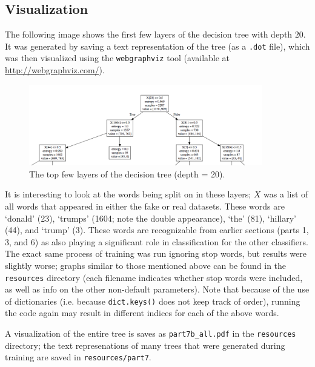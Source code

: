 \documentclass{article}
\begin{document}
   \subsection{Visualization}
   The following image shows the first few layers of the decision tree with depth $20$. It was generated by saving
   a text representation of the tree (as a \texttt{.dot} file), which was then visualized using the
   \texttt{webgraphviz} tool (available at \url{http://webgraphviz.com/}).
      \begin{figure}[h] \centering
         \includegraphics[width=4in]{resources/part7b}
         \caption{The top few layers of the decision tree (depth = 20).}
         \label{part7b}
      \end{figure}

   It is interesting to look at the words being split on in these layers; $X$ was a list of all words
   that appeared in either the fake or real datasets. These words are `donald' (23), `trumps' (1604; note the
   double appearance), `the' (81), `hillary' (44), and `trump' (3). These words are recognizable from earlier
   sections (parts 1, 3, and 6) as also playing a significant role in classification for the other classifiers.
   The exact same process of training was run
   ignoring stop words, but results were slightly worse; graphs similar to those mentioned above can be found
   in the \texttt{resources} directory (each filename indicates whether stop words were included, as well as info
   on the other non-default parameters). Note that because of the use of dictionaries (i.e. because
   \texttt{dict.keys()} does not keep track of order), running the code again may result in different indices
   for each of the above words.


   A visualization of the entire tree is saves as \texttt{part7b\_all.pdf}
   in the \texttt{resources} directory; the text represenations of many trees that were generated during
   training are saved in \texttt{resources/part7}.
\end{document}
